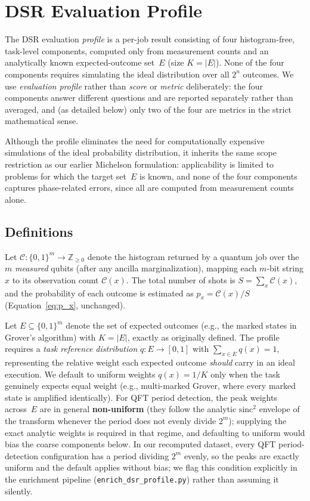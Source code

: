 \section{DSR Evaluation Profile}
\label{sec:dsr}

The DSR evaluation \emph{profile} is a per-job result consisting of four histogram-free, task-level components, computed only from measurement counts and an analytically known expected-outcome set~$E$ (size $K=|E|$). None of the four components requires simulating the ideal distribution over all $2^n$ outcomes. We use \emph{evaluation profile} rather than \emph{score} or \emph{metric} deliberately: the four components answer different questions and are reported separately rather than averaged, and (as detailed below) only two of the four are metrics in the strict mathematical sense.

Although the profile eliminates the need for computationally expensive simulations of the ideal probability distribution, it inherits the same scope restriction as our earlier Michelson formulation: applicability is limited to problems for which the target set~$E$ is known, and none of the four components captures phase-related errors, since all are computed from measurement counts alone.

\subsection{Definitions}

Let $\mathcal{C} : \{0,1\}^m \to \mathbb{Z}_{\geq 0}$ denote the histogram returned by a quantum job over the $m$ \emph{measured} qubits (after any ancilla marginalization), mapping each $m$-bit string $x$ to its observation count $\mathcal{C}(x)$. The total number of shots is $S = \sum_{x} \mathcal{C}(x)$, and the probability of each outcome is estimated as $p_x = \mathcal{C}(x)/S$ (Equation~\eqref{eq:p_x}, unchanged).

Let $E \subseteq \{0,1\}^m$ denote the set of expected outcomes (e.g., the marked states in Grover's algorithm) with $K = |E|$, exactly as originally defined. The profile requires a \emph{task reference distribution} $q : E \to [0,1]$ with $\sum_{x \in E} q(x) = 1$, representing the relative weight each expected outcome \emph{should} carry in an ideal execution. We default to uniform weights $q(x) = 1/K$ only when the task genuinely expects equal weight (e.g., multi-marked Grover, where every marked state is amplified identically). For QFT period detection, the peak weights across~$E$ are in general \textbf{non-uniform} (they follow the analytic $\mathrm{sinc}^2$ envelope of the transform whenever the period does not evenly divide $2^m$); supplying the exact analytic weights is required in that regime, and defaulting to uniform would bias the coarse components below. In our recomputed dataset, every QFT period-detection configuration has a period dividing $2^m$ evenly, so the peaks are exactly uniform and the default applies without bias; we flag this condition explicitly in the enrichment pipeline (\texttt{enrich\_dsr\_profile.py}) rather than assuming it silently.


